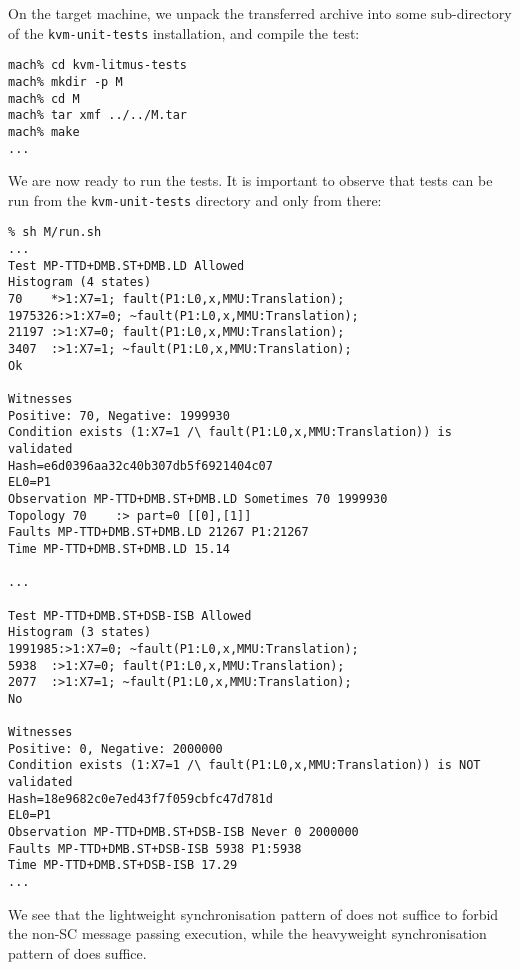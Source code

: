 On the target machine, we unpack the transferred archive into some
sub-directory of the \texttt{kvm-unit-tests} installation, and compile
the test:
\begin{verbatim}
mach% cd kvm-litmus-tests
mach% mkdir -p M
mach% cd M
mach% tar xmf ../../M.tar
mach% make
...
\end{verbatim}
We are now ready to run the tests. It is important to observe that
tests can be run from the \texttt{kvm-unit-tests} directory and only from
there:
\begin{verbatim}
% sh M/run.sh
...
Test MP-TTD+DMB.ST+DMB.LD Allowed
Histogram (4 states)
70    *>1:X7=1; fault(P1:L0,x,MMU:Translation);
1975326:>1:X7=0; ~fault(P1:L0,x,MMU:Translation);
21197 :>1:X7=0; fault(P1:L0,x,MMU:Translation);
3407  :>1:X7=1; ~fault(P1:L0,x,MMU:Translation);
Ok

Witnesses
Positive: 70, Negative: 1999930
Condition exists (1:X7=1 /\ fault(P1:L0,x,MMU:Translation)) is validated
Hash=e6d0396aa32c40b307db5f6921404c07
EL0=P1
Observation MP-TTD+DMB.ST+DMB.LD Sometimes 70 1999930
Topology 70    :> part=0 [[0],[1]]
Faults MP-TTD+DMB.ST+DMB.LD 21267 P1:21267
Time MP-TTD+DMB.ST+DMB.LD 15.14

...

Test MP-TTD+DMB.ST+DSB-ISB Allowed
Histogram (3 states)
1991985:>1:X7=0; ~fault(P1:L0,x,MMU:Translation);
5938  :>1:X7=0; fault(P1:L0,x,MMU:Translation);
2077  :>1:X7=1; ~fault(P1:L0,x,MMU:Translation);
No

Witnesses
Positive: 0, Negative: 2000000
Condition exists (1:X7=1 /\ fault(P1:L0,x,MMU:Translation)) is NOT validated
Hash=18e9682c0e7ed43f7f059cbfc47d781d
EL0=P1
Observation MP-TTD+DMB.ST+DSB-ISB Never 0 2000000
Faults MP-TTD+DMB.ST+DSB-ISB 5938 P1:5938
Time MP-TTD+DMB.ST+DSB-ISB 17.29
...
\end{verbatim}
We see that the lightweight synchronisation pattern
of  does not suffice to forbid the non-SC
message passing execution, while the heavyweight  synchronisation
pattern of  does suffice.

